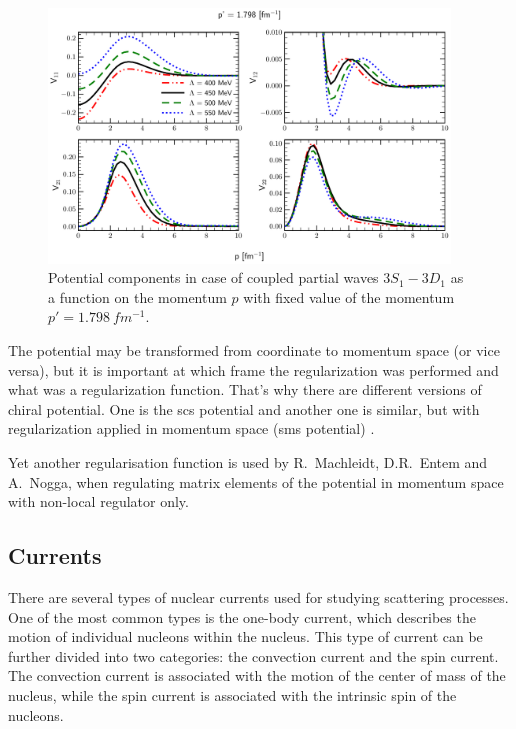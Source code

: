 \begin{figure}[htb]
    \begin{center}
    \includegraphics[width=0.95\textwidth]{PlotData/Deuteron/WAVEFUNC/potential_pp1.798.pdf}
    \end{center}
    \caption{Potential components in case of coupled partial waves $3S_1 - 3D_1$ as a function on the momentum $p$ with fixed
    value of the momentum $p'=\SI{1.798}{fm^{-1}}$.
    }
    \label{potential_cutoff}
\end{figure}



The potential may be transformed from coordinate to momentum space (or vice versa),
but it is important at which frame the regularization was performed
and what was a regularization function. That's why there are different 
versions of chiral potential. One is the \gls{scs} potential \cite{Epelbaum2014SCS}
and another one is similar, but with regularization applied in momentum space (\gls{sms} potential) \cite{reinkrebs2018}.

Yet another regularisation function  is used by R.~Machleidt, D.R.~Entem and A.~Nogga, 
when regulating matrix elements of the potential in momentum space with non-local regulator only.

\subsection*{Currents}
 
There are several types of nuclear currents used for studying scattering processes. One of the most common types is the one-body current, which describes the motion of individual nucleons within the nucleus. This type of current can be further divided into two categories: the convection current and the spin current. The convection current is associated with the motion of the center of mass of the nucleus, while the spin current is associated with the intrinsic spin of the nucleons.

